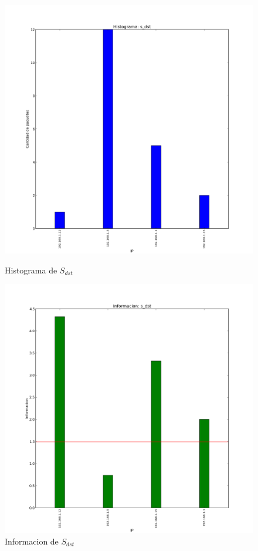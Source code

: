 \documentclass[10pt, a4paper]{article}
\begin{document}
\begin{figure}[H]
  \begin{minipage}{0.5\linewidth}
    \includegraphics[width=\linewidth]{../imgs/pruebaFede-ips_s_dst_hist.png}
    \caption{Histograma de $S_{dst}$}\label{fig:Fede-dst-hist}
  \end{minipage}
\hfill
  \begin{minipage}{0.5\linewidth}
    \includegraphics[width=\linewidth]{../imgs/pruebaFede-ips_s_dst_info.png}
    \caption{Informacion de $S_{dst}$}\label{fig:Fede-dst-info}
  \end{minipage}
\end{figure}
\end{document}
